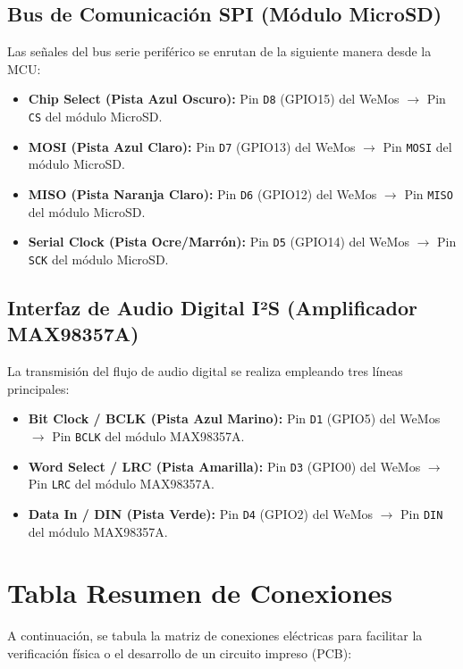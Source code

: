 \documentclass[11pt,a4paper]{article}
\begin{document}
\subsection{Bus de Comunicación SPI (Módulo MicroSD)}
Las señales del bus serie periférico se enrutan de la siguiente manera desde la MCU:
\begin{itemize}
    \item \textbf{Chip Select (Pista Azul Oscuro):} Pin \texttt{D8} (GPIO15) del WeMos $\rightarrow$ Pin \texttt{CS} del módulo MicroSD.
    \item \textbf{MOSI (Pista Azul Claro):} Pin \texttt{D7} (GPIO13) del WeMos $\rightarrow$ Pin \texttt{MOSI} del módulo MicroSD.
    \item \textbf{MISO (Pista Naranja Claro):} Pin \texttt{D6} (GPIO12) del WeMos $\rightarrow$ Pin \texttt{MISO} del módulo MicroSD.
    \item \textbf{Serial Clock (Pista Ocre/Marrón):} Pin \texttt{D5} (GPIO14) del WeMos $\rightarrow$ Pin \texttt{SCK} del módulo MicroSD.
\end{itemize}

\subsection{Interfaz de Audio Digital I²S (Amplificador MAX98357A)}
La transmisión del flujo de audio digital se realiza empleando tres líneas principales:
\begin{itemize}
    \item \textbf{Bit Clock / BCLK (Pista Azul Marino):} Pin \texttt{D1} (GPIO5) del WeMos $\rightarrow$ Pin \texttt{BCLK} del módulo MAX98357A.
    \item \textbf{Word Select / LRC (Pista Amarilla):} Pin \texttt{D3} (GPIO0) del WeMos $\rightarrow$ Pin \texttt{LRC} del módulo MAX98357A.
    \item \textbf{Data In / DIN (Pista Verde):} Pin \texttt{D4} (GPIO2) del WeMos $\rightarrow$ Pin \texttt{DIN} del módulo MAX98357A.
\end{itemize}

\section{Tabla Resumen de Conexiones}
A continuación, se tabula la matriz de conexiones eléctricas para facilitar la verificación física o el desarrollo de un circuito impreso (PCB):
\end{document}
